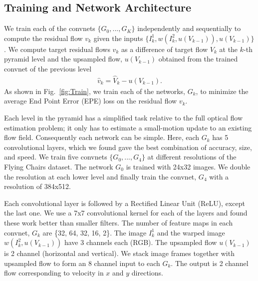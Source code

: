 \documentclass[10pt,twocolumn,letterpaper]{article}
\begin{document}
\subsection{Training and Network Architecture}
We train each of the convnets $\{G_0,...,G_K\}$ independently and sequentially to compute the residual flow $v_k$ given the inputs $\{I_k^1, w(I_k^2,u(V_{k-1}) ), u(V_{k-1})\}$. We compute target residual flows $\hat{v}_k$ as a difference of target flow $V_k$ at the $k$-th pyramid level and the upsampled flow, $u(V_{k-1})$ obtained from the trained convnet of the previous level
\begin{align}
\hat{v}_k = \hat{V}_k - u(V_{k-1}) .
\end{align}
As shown in Fig.~\ref{fig:Train}, we train each of the networks, $G_k$, to minimize the average End Point Error (EPE) loss on the residual flow $v_k$.

Each level in the pyramid has a simplified task relative to the full optical flow estimation problem; it only has to estimate a small-motion update to an existing flow field.
Consequently each network can be simple.
Here, each $G_k$ has 5 convolutional layers, which we found gave the best combination of accuracy, size, and speed.
We train five convnets $\{G_0, ..., G_4 \}$ at different resolutions of the Flying Chairs dataset. The network $G_0$ is trained with 24x32 images. We double the resolution at each lower level and finally train the convnet, $G_4$ with a resolution of 384x512.

Each convolutional layer is followed by a Rectified Linear Unit (ReLU), except the last one. 
We use a 7x7 convolutional kernel for each of the layers and found these work better than smaller filters.
The number of feature maps in each convnet, $G_k$ are \{32, 64, 32, 16, 2\}. The image $I^1_k$ and the warped image $w(I^2_k, u(V_{k-1}))$ have 3 channels each (RGB). The upsampled flow $u(V_{k-1})$ is 2 channel (horizontal and vertical).  
We stack image frames together with upsampled flow to form an 8 channel input to each $G_k$. The output is 2 channel flow corresponding to velocity in $x$ and $y$ directions. 

\end{document}
